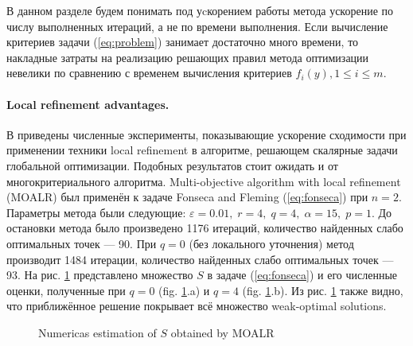\documentclass{llncs}
\begin{document}
В данном разделе будем понимать под уcкорением работы метода ускорение по числу выполненных итераций, а не по времени выполнения. Если вычисление критериев задачи (\ref{eq:problem}) занимает достаточно много времени, то накладные затраты на реализацию решающих правил метода оптимизации невелики по сравнению с временем вычисления критериев \(f_i(y), 1\leqslant i\leqslant m\).

\paragraph{Local refinement advantages.} В \cite{barkalovLebedev2016} приведены численные эксперименты, показывающие ускорение сходимости при применении техники local refinement в алгоритме, решающем скалярные задачи глобальной оптимизации. Подобных результатов стоит ожидать и от многокритериального алгоритма. Multi-objective algorithm with local refinement (MOALR) был применён к задаче Fonseca and Fleming (\ref{eq:fonseca}) при \(n=2\). Параметры метода были следующие: \(\varepsilon=0.01,\;r=4,\;q=4,\;\alpha=15,\;p=1\). До остановки метода было произведено 1176 итераций, количество найденных слабо оптимальных точек --- 90. При \(q=0\) (без локального уточнения) метод производит 1484 итерации, количество найденных слабо оптимальных точек --- 93. На рис. \ref{fig:fonseca_slater} представлено множество \(S\) в задаче (\ref{eq:fonseca}) и его численные оценки, полученные при \(q=0\) (fig. \ref{fig:fonseca_slater}.a) и \(q=4\) (fig. \ref{fig:fonseca_slater}.b). Из рис. \ref{fig:fonseca_slater} также видно, что приближённое решение покрывает всё множество weak-optimal solutions.

\begin{figure}[ht]
    \centering
    \caption{Numericas estimation of \(S\) obtained by MOALR}
    \label{fig:fonseca_slater}
\end{figure}
\end{document}
